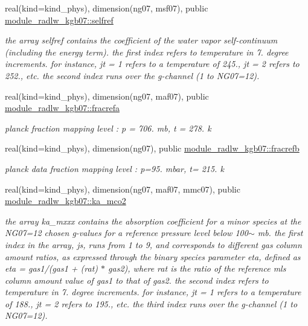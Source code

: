 \begin{Indent}
\begin{DoxyCompactItemize}
real(kind=kind\+\_\+phys), dimension(ng07, msf07), public \hyperlink{group__module__radlw__kgbnn_gaaf6d41f390a0465af92756b9c3e6c558}{module\+\_\+radlw\+\_\+kgb07\+::selfref}
\begin{DoxyCompactList}\small\item\em the array selfref contains the coefficient of the water vapor self-\/continuum (including the energy term). the first index refers to temperature in 7. degree increments. for instance, jt = 1 refers to a temperature of 245., jt = 2 refers to 252., etc. the second index runs over the g-\/channel (1 to N\+G07=12). \end{DoxyCompactList}\item 
real(kind=kind\+\_\+phys), dimension(ng07, maf07), public \hyperlink{group__module__radlw__kgbnn_ga07f2a4a0f1152a65aed68623f14a9ae4}{module\+\_\+radlw\+\_\+kgb07\+::fracrefa}
\begin{DoxyCompactList}\small\item\em planck fraction mapping level \+: p = 706. mb, t = 278. k \end{DoxyCompactList}\item 
real(kind=kind\+\_\+phys), dimension(ng07), public \hyperlink{group__module__radlw__kgbnn_gaa16eb60406e5a298e380b55af528791a}{module\+\_\+radlw\+\_\+kgb07\+::fracrefb}
\begin{DoxyCompactList}\small\item\em planck data fraction mapping level \+: p=95. mbar, t= 215. k \end{DoxyCompactList}\item 
real(kind=kind\+\_\+phys), dimension(ng07, maf07, mmc07), public \hyperlink{group__module__radlw__kgbnn_ga3fdad494f3d3fcf9306da6a81d97bd43}{module\+\_\+radlw\+\_\+kgb07\+::ka\+\_\+mco2}
\begin{DoxyCompactList}\small\item\em the array ka\+\_\+mxxx contains the absorption coefficient for a minor species at the N\+G07=12 chosen g-\/values for a reference pressure level below 100$\sim$ mb. the first index in the array, js, runs from 1 to 9, and corresponds to different gas column amount ratios, as expressed through the binary species parameter eta, defined as eta = gas1/(gas1 + (rat) $\ast$ gas2), where rat is the ratio of the reference mls column amount value of gas1 to that of gas2. the second index refers to temperature in 7. degree increments. for instance, jt = 1 refers to a temperature of 188., jt = 2 refers to 195., etc. the third index runs over the g-\/channel (1 to N\+G07=12). \end{DoxyCompactList}\item 

\end{DoxyCompactItemize}
\end{Indent}
